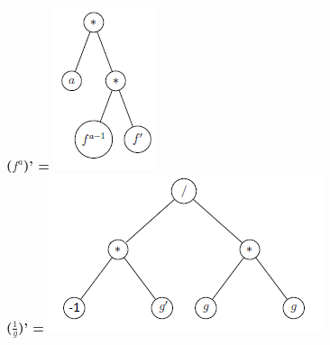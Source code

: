 \documentclass[10pt,a4paper]{article}
\begin{document}
\textbf{($f^{a}$)' =} \includegraphics[scale=1]{q9-fa.png}\\
\textbf{($\frac{1}{g}$)' =} \includegraphics[scale=1]{q9-1divg.png}
\end{document}
